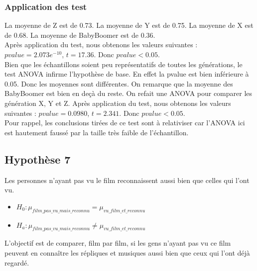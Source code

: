 \documentclass{article} %
\begin{document}
\subsubsection{ Application des test}
La moyenne de Z est de 0.73. La moyenne de Y est de 0.75. La moyenne de X est de 0.68. La moyenne de BabyBoomer est de 0.36.\\
Après application du test, nous obtenons les valeurs suivantes : $pvalue = 2.073e^{-10}$, $t = 17.36$. Donc ${pvalue<0.05}$.\\
Bien que les échantillons soient peu représentatifs de toutes les générations, le test ANOVA infirme l'hypothèse de base. En effet la pvalue est bien inférieure à 0.05. Donc les moyennes sont différentes. On remarque que la moyenne des BabyBoomer est bien en deçà du reste.
On refait une ANOVA pour comparer les génération X, Y et Z.
Après application du test, nous obtenons les valeurs suivantes : $pvalue =  0.0980$, $t = 2.341$. Donc ${pvalue<0.05}$.\\
Pour rappel, les conclusions tirées de ce test sont à relativiser car l'ANOVA ici est hautement faussé par la taille très faible de l'échantillon.
\subsection{Hypothèse 7}
Les personnes n’ayant pas vu le film reconnaissent aussi bien que celles qui l’ont vu.
\begin{itemize}
	\item $H_0 : \mu_{film\_pas\_vu\_mais\_reconnu} = \mu_{vu\_film\_et\_reconnu}$
	\item $H_a : \mu_{film\_pas\_vu\_mais\_reconnu} \ne \mu_{vu\_film\_et\_reconnu}$
\end{itemize}
L’objectif est de comparer, film par film, si les gens n’ayant pas vu ce film peuvent en connaître les répliques et musiques aussi bien que ceux qui l’ont déjà regardé.
\end{document}
